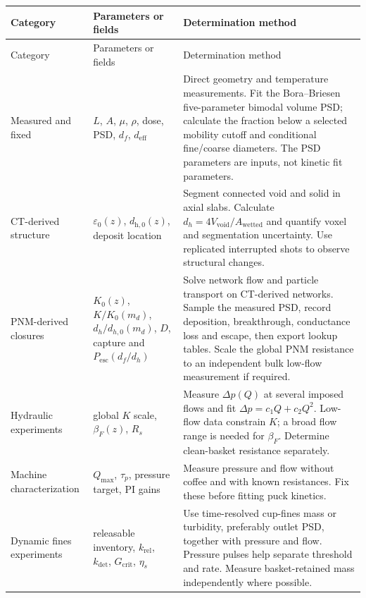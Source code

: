 \documentclass[11pt,a4paper]{article}
\begin{document}
\begin{longtable}{@{}>{\raggedright\arraybackslash}p{2.7cm}
>{\raggedright\arraybackslash}p{4.4cm}
>{\raggedright\arraybackslash}p{7.2cm}@{}}
\toprule
Category & Parameters or fields & Determination method\\
\midrule
\endfirsthead
\toprule
Category & Parameters or fields & Determination method\\
\midrule
\endhead
Measured and fixed &
$L$, $A$, $\mu$, $\rho$, dose, PSD, $d_f$, $d_{\mathrm{eff}}$ &
Direct geometry and temperature measurements. Fit the Bora--Briesen
five-parameter bimodal volume PSD; calculate the fraction below a selected
mobility cutoff and conditional fine/coarse diameters. The PSD parameters are
inputs, not kinetic fit parameters.\\
\addlinespace
CT-derived structure &
$\varepsilon_0(z)$, $d_{\mathrm h,0}(z)$, deposit location &
Segment connected void and solid in axial slabs. Calculate
$d_h=4V_{\mathrm{void}}/A_{\mathrm{wetted}}$ and quantify voxel and
segmentation uncertainty. Use replicated interrupted shots to observe
structural changes.\\
\addlinespace
PNM-derived closures &
$K_0(z)$, $K/K_0(m_d)$, $d_h/d_{h,0}(m_d)$, $D$, capture and
$P_{\mathrm{esc}}(d_f/d_h)$ &
Solve network flow and particle transport on CT-derived networks. Sample the
measured PSD, record deposition, breakthrough, conductance loss and escape,
then export lookup tables. Scale the global PNM resistance to an independent
bulk low-flow measurement if required.\\
\addlinespace
Hydraulic experiments &
global $K$ scale, $\beta_F(z)$, $R_s$ &
Measure $\Delta p(Q)$ at several imposed flows and fit
$\Delta p=c_1Q+c_2Q^2$. Low-flow data constrain $K$; a broad flow range is
needed for $\beta_F$. Determine clean-basket resistance separately.\\
\addlinespace
Machine characterization &
$Q_{\max}$, $\tau_p$, pressure target, PI gains &
Measure pressure and flow without coffee and with known resistances. Fix these
before fitting puck kinetics.\\
\addlinespace
Dynamic fines experiments &
releasable inventory, $k_{\mathrm{rel}}$, $k_{\mathrm{det}}$,
$G_{\mathrm{crit}}$, $\eta_s$ &
Use time-resolved cup-fines mass or turbidity, preferably outlet PSD, together
with pressure and flow. Pressure pulses help separate threshold and rate.
Measure basket-retained mass independently where possible.\\
\bottomrule
\end{longtable}
\end{document}

